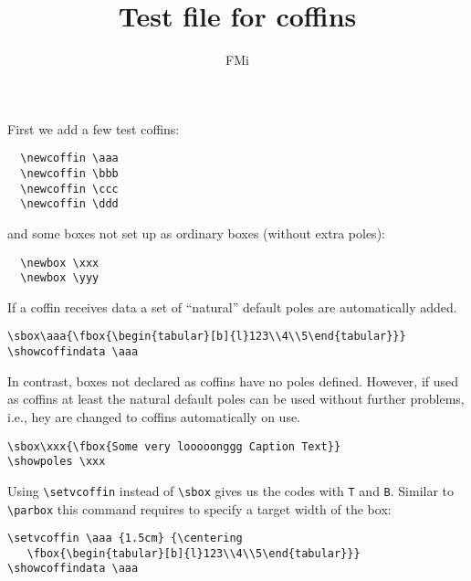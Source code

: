 \documentclass{article}
\begin{document}
\title{Test file for coffins}
\author{FMi}
\maketitle

First we add a few test coffins:
\begin{verbatim}
  \newcoffin \aaa
  \newcoffin \bbb
  \newcoffin \ccc
  \newcoffin \ddd
\end{verbatim}
  \newcoffin \aaa
  \newcoffin \bbb
  \newcoffin \ccc
  \newcoffin \ddd
and some boxes not set up as ordinary boxes (without extra poles):
\begin{verbatim}
  \newbox \xxx
  \newbox \yyy
\end{verbatim}
  \newbox \xxx
  \newbox \yyy


If a coffin receives data a set of ``natural'' default poles are automatically added.
\begin{verbatim}
\sbox\aaa{\fbox{\begin{tabular}[b]{l}123\\4\\5\end{tabular}}}
\showcoffindata \aaa
\end{verbatim}
\sbox{}
\showcoffindata \aaa


In contrast, boxes not declared as coffins have no poles defined. However, if
used as coffins at least the natural default poles can be used without
further problems, i.e., hey are changed to coffins automatically on use.
\begin{verbatim}
\sbox\xxx{\fbox{Some very looooonggg Caption Text}}
\showpoles \xxx
\end{verbatim}
\sbox{}
\showcoffindata \xxx


Using \verb|\setvcoffin| instead of \verb|\sbox| gives us the codes with
\texttt{T} and \texttt{B}. Similar to \verb|\parbox| this command requires to
specify a target width of the box:
\begin{verbatim}
\setvcoffin \aaa {1.5cm} {\centering
   \fbox{\begin{tabular}[b]{l}123\\4\\5\end{tabular}}}
\showcoffindata \aaa
\end{verbatim}
\setvcoffin \aaa {1.5cm} {\centering
   }
\showcoffindata \aaa
\end{document}

